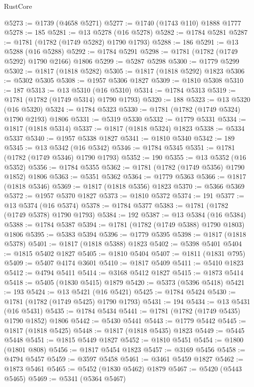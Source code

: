 \begin{lexlean}{RustCore}
\begin{coremodule}
@5273 := @1739 (@4658 @5271)
@5277 := @1740 (@1743 @110) @1888 @1777
@5278 := 185
@5281 := @13 @5278 (@16 @5278)
@5282 := @1784 @5281
@5287 := @1781 (@1782 (@1749 @5282) @1790 @1793)
@5288 := 186
@5291 := @13 @5288 (@16 @5288)
@5292 := @1784 @5291
@5298 := @1781 (@1782 (@1749 @5292) @1790 @2166) @1806
@5299 := @5287 @5298
@5300 := @1779 @5299
@5302 := @1817 (@1818 @5282)
@5305 := @1817 (@1818 @5292) @1823
@5306 := @5302 @5305
@5308 := @1957 @5306 @1827
@5309 := @1810 @5308
@5310 := 187
@5313 := @13 @5310 (@16 @5310)
@5314 := @1784 @5313
@5319 := @1781 (@1782 (@1749 @5314) @1790 @1793)
@5320 := 188
@5323 := @13 @5320 (@16 @5320)
@5324 := @1784 @5323
@5330 := @1781 (@1782 (@1749 @5324) @1790 @2193) @1806
@5331 := @5319 @5330
@5332 := @1779 @5331
@5334 := @1817 (@1818 @5314)
@5337 := @1817 (@1818 @5324) @1823
@5338 := @5334 @5337
@5340 := @1957 @5338 @1827
@5341 := @1810 @5340
@5342 := 189
@5345 := @13 @5342 (@16 @5342)
@5346 := @1784 @5345
@5351 := @1781 (@1782 (@1749 @5346) @1790 @1793)
@5352 := 190
@5355 := @13 @5352 (@16 @5352)
@5356 := @1784 @5355
@5362 := @1781 (@1782 (@1749 @5356) @1790 @1852) @1806
@5363 := @5351 @5362
@5364 := @1779 @5363
@5366 := @1817 (@1818 @5346)
@5369 := @1817 (@1818 @5356) @1823
@5370 := @5366 @5369
@5372 := @1957 @5370 @1827
@5373 := @1810 @5372
@5374 := 191
@5377 := @13 @5374 (@16 @5374)
@5378 := @1784 @5377
@5383 := @1781 (@1782 (@1749 @5378) @1790 @1793)
@5384 := 192
@5387 := @13 @5384 (@16 @5384)
@5388 := @1784 @5387
@5394 := @1781 (@1782 (@1749 @5388) @1790 @1803) @1806
@5395 := @5383 @5394
@5396 := @1779 @5395
@5398 := @1817 (@1818 @5378)
@5401 := @1817 (@1818 @5388) @1823
@5402 := @5398 @5401
@5404 := @1815 @5402 @1827
@5405 := @1810 @5404
@5407 := @1811 (@1831 @795)
@5409 := @5407 @4174 @3601
@5410 := @1817 @5409
@5411 := @5410 @1823
@5412 := @4794 @5411
@5414 := @3168 @5412 @1827
@5415 := @1873 @5414
@5418 := @5405 (@1830 @5415) @1879
@5420 := @5373 (@5396 @5418)
@5421 := 193
@5424 := @13 @5421 (@16 @5421)
@5425 := @1784 @5424
@5430 := @1781 (@1782 (@1749 @5425) @1790 @1793)
@5431 := 194
@5434 := @13 @5431 (@16 @5431)
@5435 := @1784 @5434
@5441 := @1781 (@1782 (@1749 @5435) @1790 @1852) @1806
@5442 := @5430 @5441
@5443 := @1779 @5442
@5445 := @1817 (@1818 @5425)
@5448 := @1817 (@1818 @5435) @1823
@5449 := @5445 @5448
@5451 := @1815 @5449 @1827
@5452 := @1810 @5451
@5454 := @1800 (@1801 @808)
@5456 := @1817 @5454 @1823
@5457 := @3169 @5456
@5458 := @4794 @5457
@5459 := @3597 @5458
@5461 := @3461 @5459 @1827
@5462 := @1873 @5461
@5465 := @5452 (@1830 @5462) @1879
@5467 := @5420 (@5443 @5465)
@5469 := @5341 (@5364 @5467)

\end{coremodule}
\end{lexlean}
